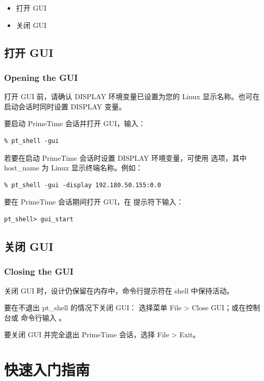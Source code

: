 \begin{seeAlsoBox}
\begin{itemize}
  \item 打开 GUI
  \item 关闭 GUI
\end{itemize}
\end{seeAlsoBox}

\subsection{打开 GUI}
\subsubsection*{Opening the GUI}

打开 GUI 前，请确认 DISPLAY 环境变量已设置为您的 Linux 显示名称。也可在启动会话时同时设置 DISPLAY 变量。

要启动 PrimeTime 会话并打开 GUI，输入：
\begin{lstlisting}
% pt_shell -gui
\end{lstlisting}

若要在启动 PrimeTime 会话时设置 DISPLAY 环境变量，可使用  选项，其中 host\_name 为 Linux 显示终端名称。例如：
\begin{lstlisting}
% pt_shell -gui -display 192.180.50.155:0.0
\end{lstlisting}

要在 PrimeTime 会话期间打开 GUI，在  提示符下输入：
\begin{lstlisting}
pt_shell> gui_start
\end{lstlisting}

\subsection{关闭 GUI}
\subsubsection*{Closing the GUI}

关闭 GUI 时，设计仍保留在内存中，命令行提示符在 shell 中保持活动。

要在不退出 pt_shell 的情况下关闭 GUI：
选择菜单 File > Close GUI；或在控制台或  命令行输入 。

要关闭 GUI 并完全退出 PrimeTime 会话，选择 File > Exit。

\section{快速入门指南}

